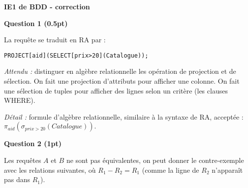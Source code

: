\documentclass{article}
\begin{document}
\begin{center}
{\Large \textbf{IE1 de BDD - correction}}
\end{center}

\noindent\hrulefill
\vspace{0.5cm}

\noindent
\textbf{Question 1 (0.5pt)}

\noindent
La requête se traduit en RA par :
\begin{verbatim}
PROJECT[aid](SELECT[prix>20](Catalogue));
\end{verbatim}

\noindent
\textit{Attendu :} distinguer en algèbre relationnelle les opération de projection et de sélection. On fait une projection d'attributs pour afficher une colonne. On fait une sélection de tuples pour afficher des lignes selon un critère (les clauses WHERE).

\noindent
\textit{Détail :} formule d'algèbre relationnelle, similaire à la syntaxe de RA, acceptée :
$\pi_{aid}(\sigma_{prix>20}(Catalogue)).$

\vspace{0.3cm}
\noindent
\textbf{Question 2 (1pt)}

\noindent
Les requêtes $A$ et $B$ ne sont pas équivalentes, on peut donner le contre-exemple avec les relations suivantes, où $R_1 - R_2 = R_1$ (comme la ligne de $R_2$ n'apparaît pas dans $R_1$).
\end{document}
